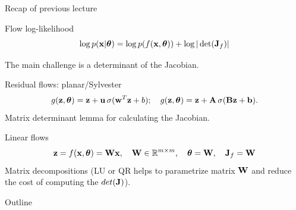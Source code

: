 \begin{frame}{Recap of previous lecture}
	\vspace{-0.5cm}
	\begin{block}{Flow log-likelihood}
		\vspace{-0.3cm}
		\[
			\log p(\mathbf{x}|\boldsymbol{\theta}) = \log p(f(\mathbf{x}, \boldsymbol{\theta})) + \log  |\det (\mathbf{J}_f)|
		\]
		\vspace{-0.5cm}
	\end{block}
	The main challenge is a determinant of the Jacobian.
	\begin{block}{Residual flows: planar/Sylvester}
		\vspace{-0.7cm}
		\[
			g(\mathbf{z}, \boldsymbol{\theta}) = \mathbf{z} + \mathbf{u} \, \sigma(\mathbf{w}^T\mathbf{z} + b); \quad 
			g(\mathbf{z}, \boldsymbol{\theta}) = \mathbf{z} + \mathbf{A} \, \sigma(\mathbf{B}\mathbf{z} + \mathbf{b}).
		\]
		Matrix determinant lemma for calculating the Jacobian.
	\end{block}
	\begin{block}{Linear flows}	
		\vspace{-0.2cm}
		\[
			\mathbf{z} = f(\mathbf{x}, \boldsymbol{\theta}) = \mathbf{W} \mathbf{x}, \quad \mathbf{W} \in \mathbb{R}^{m \times m}, \quad \boldsymbol{\theta} = \mathbf{W}, \quad \mathbf{J}_f = \mathbf{W}
		\]
		Matrix decompositions (LU or QR helps to parametrize matrix $\mathbf{W}$ and reduce the cost of computing the $det(\mathbf{J})$).
	\end{block}
\end{frame}
\begin{frame}{Outline}
	\tableofcontents
\end{frame}
